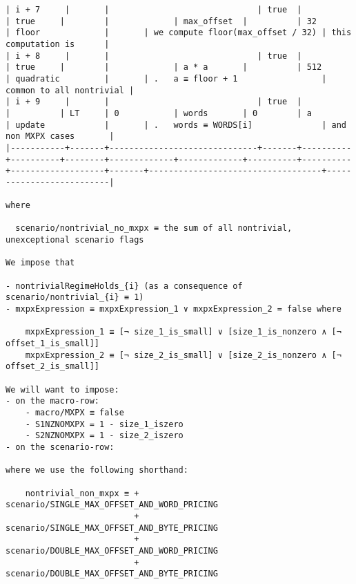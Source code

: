 \documentclass[varwidth=\maxdimen,margin=0.5cm,multi={verbatim}]{standalone}
\begin{document}
\begin{verbatim}
| i + 7     |       |                              | true  |          | true     |        |             | max_offset  |          | 32       | floor             |       | we compute floor(max_offset / 32) | this computation is      |
| i + 8     |       |                              | true  |          | true     |        |             | a * a       |          | 512      | quadratic         |       | .   a ≡ floor + 1                 | common to all nontrivial |
| i + 9     |       |                              | true  |          |          | LT     | 0           | words       | 0        | a        | update            |       | .   words ≡ WORDS[i]              | and non MXPX cases       |
|-----------+-------+------------------------------+-------+----------+----------+--------+-------------+-------------+----------+----------+-------------------+-------+-----------------------------------+--------------------------|

where 

  scenario/nontrivial_no_mxpx ≡ the sum of all nontrivial, unexceptional scenario flags

We impose that

- nontrivialRegimeHolds_{i} (as a consequence of scenario/nontrivial_{i} ≡ 1)
- mxpxExpression ≡ mxpxExpression_1 ∨ mxpxExpression_2 = false where

	mxpxExpression_1 ≡ [¬ size_1_is_small] ∨ [size_1_is_nonzero ∧ [¬ offset_1_is_small]]
	mxpxExpression_2 ≡ [¬ size_2_is_small] ∨ [size_2_is_nonzero ∧ [¬ offset_2_is_small]]

We will want to impose:
- on the macro-row:
	- macro/MXPX ≡ false
	- S1NZNOMXPX = 1 - size_1_iszero
	- S2NZNOMXPX = 1 - size_2_iszero
- on the scenario-row:

where we use the following shorthand:

    nontrivial_non_mxpx ≡ + scenario/SINGLE_MAX_OFFSET_AND_WORD_PRICING
                          + scenario/SINGLE_MAX_OFFSET_AND_BYTE_PRICING
                          + scenario/DOUBLE_MAX_OFFSET_AND_WORD_PRICING
                          + scenario/DOUBLE_MAX_OFFSET_AND_BYTE_PRICING

\end{verbatim}
\end{document}
